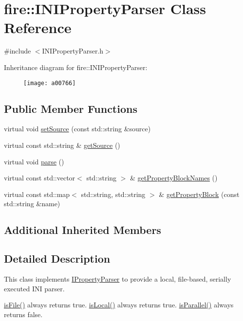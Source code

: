 \hypertarget{a00766}{}\section{fire\+:\+:I\+N\+I\+Property\+Parser Class Reference}
\label{a00766}


{\ttfamily \#include $<$I\+N\+I\+Property\+Parser.\+h$>$}

Inheritance diagram for fire\+:\+:I\+N\+I\+Property\+Parser\+:\begin{figure}[H]
\begin{center}
\leavevmode
\texttt{[image: a00766]}
\end{center}
\end{figure}
\subsection*{Public Member Functions}
\begin{DoxyCompactItemize}
\item 
virtual void \hyperlink{a00766_a06793909bc707a69d0c5772b14bc946d}{set\+Source} (const std\+::string \&source)
\item 
virtual const std\+::string \& \hyperlink{a00766_ad02c9a530f20a706d7bb2554813e8d3a}{get\+Source} ()
\item 
virtual void \hyperlink{a00766_a31b6bad01e65ed4bb5f1ba297616c641}{parse} ()
\item 
virtual const std\+::vector$<$ std\+::string $>$ \& \hyperlink{a00766_aed0f1f47111794659564dcddb4d25bc6}{get\+Property\+Block\+Names} ()
\item 
virtual const std\+::map$<$ std\+::string, std\+::string $>$ \& \hyperlink{a00766_a3591312590a66659ebd377cdde9ab9ad}{get\+Property\+Block} (const std\+::string \&name)
\end{DoxyCompactItemize}
\subsection*{Additional Inherited Members}


\subsection{Detailed Description}
This class implements \hyperlink{a00774}{I\+Property\+Parser} to provide a local, file-\/based, serially executed I\+NI parser.

\hyperlink{a00762_a091d5cf56bf8f407854ef87f460b2958}{is\+File()} always returns true. \hyperlink{a00762_a770acae6e216de3a9c7140a12de25d58}{is\+Local()} always returns true. \hyperlink{a00762_ad46898c516adcce38acbb4800dc9777b}{is\+Parallel()} always returns false.

